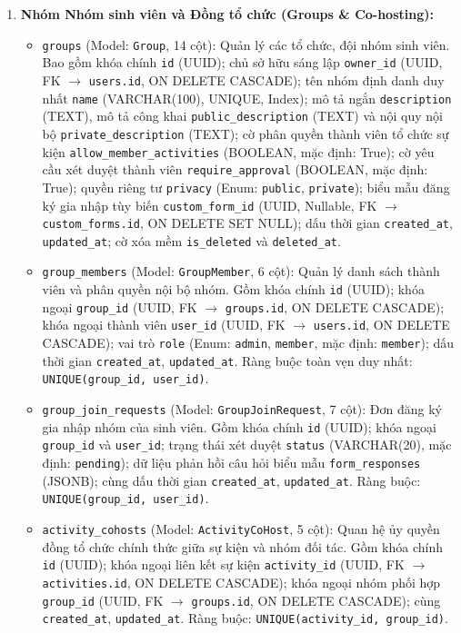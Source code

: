 \begin{enumerate}
    \item \textbf{Nhóm Nhóm sinh viên và Đồng tổ chức (Groups \& Co-hosting):}
    \begin{itemize}
        \item \texttt{groups} (Model: \texttt{Group}, 14 cột): Quản lý các tổ chức, đội nhóm sinh viên. Bao gồm khóa chính \texttt{id} (UUID); chủ sở hữu sáng lập \texttt{owner\_id} (UUID, FK $\rightarrow$ \texttt{users.id}, ON DELETE CASCADE); tên nhóm định danh duy nhất \texttt{name} (VARCHAR(100), UNIQUE, Index); mô tả ngắn \texttt{description} (TEXT), mô tả công khai \texttt{public\_description} (TEXT) và nội quy nội bộ \texttt{private\_description} (TEXT); cờ phân quyền thành viên tổ chức sự kiện \texttt{allow\_member\_activities} (BOOLEAN, mặc định: True); cờ yêu cầu xét duyệt thành viên \texttt{require\_approval} (BOOLEAN, mặc định: True); quyền riêng tư \texttt{privacy} (Enum: \texttt{public}, \texttt{private}); biểu mẫu đăng ký gia nhập tùy biến \texttt{custom\_form\_id} (UUID, Nullable, FK $\rightarrow$ \texttt{custom\_forms.id}, ON DELETE SET NULL); dấu thời gian \texttt{created\_at}, \texttt{updated\_at}; cờ xóa mềm \texttt{is\_deleted} và \texttt{deleted\_at}.
        \item \texttt{group\_members} (Model: \texttt{GroupMember}, 6 cột): Quản lý danh sách thành viên và phân quyền nội bộ nhóm. Gồm khóa chính \texttt{id} (UUID); khóa ngoại \texttt{group\_id} (UUID, FK $\rightarrow$ \texttt{groups.id}, ON DELETE CASCADE); khóa ngoại thành viên \texttt{user\_id} (UUID, FK $\rightarrow$ \texttt{users.id}, ON DELETE CASCADE); vai trò \texttt{role} (Enum: \texttt{admin}, \texttt{member}, mặc định: \texttt{member}); dấu thời gian \texttt{created\_at}, \texttt{updated\_at}. Ràng buộc toàn vẹn duy nhất: \texttt{UNIQUE(group\_id, user\_id)}.
        \item \texttt{group\_join\_requests} (Model: \texttt{GroupJoinRequest}, 7 cột): Đơn đăng ký gia nhập nhóm của sinh viên. Gồm khóa chính \texttt{id} (UUID); khóa ngoại \texttt{group\_id} và \texttt{user\_id}; trạng thái xét duyệt \texttt{status} (VARCHAR(20), mặc định: \texttt{pending}); dữ liệu phản hồi câu hỏi biểu mẫu \texttt{form\_responses} (JSONB); cùng dấu thời gian \texttt{created\_at}, \texttt{updated\_at}. Ràng buộc: \texttt{UNIQUE(group\_id, user\_id)}.
        \item \texttt{activity\_cohosts} (Model: \texttt{ActivityCoHost}, 5 cột): Quan hệ ủy quyền đồng tổ chức chính thức giữa sự kiện và nhóm đối tác. Gồm khóa chính \texttt{id} (UUID); khóa ngoại liên kết sự kiện \texttt{activity\_id} (UUID, FK $\rightarrow$ \texttt{activities.id}, ON DELETE CASCADE); khóa ngoại nhóm phối hợp \texttt{group\_id} (UUID, FK $\rightarrow$ \texttt{groups.id}, ON DELETE CASCADE); cùng \texttt{created\_at}, \texttt{updated\_at}. Ràng buộc: \texttt{UNIQUE(activity\_id, group\_id)}.

\end{itemize}
\end{enumerate}
